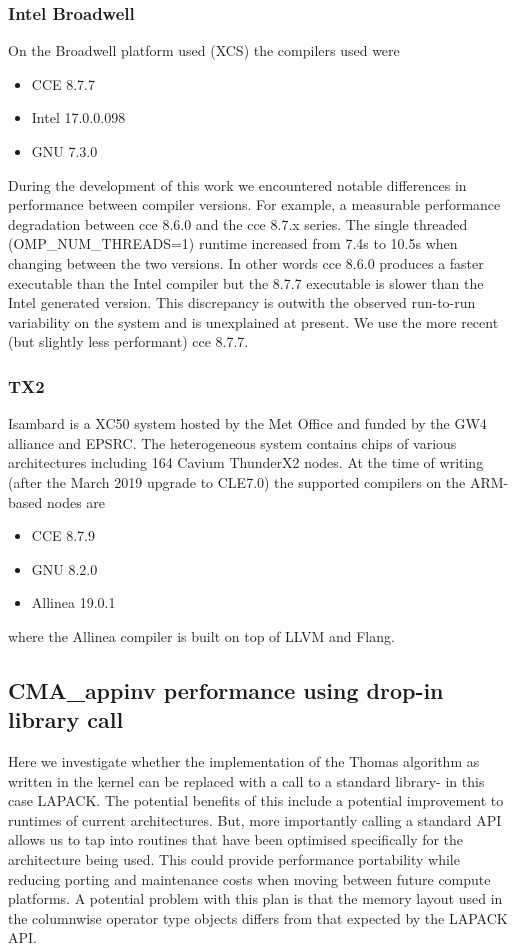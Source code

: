 \subsubsection{Intel Broadwell}
On the Broadwell platform used (XCS) the compilers used were
\begin{itemize}
\item CCE 8.7.7
\item Intel 17.0.0.098
\item GNU 7.3.0
\end{itemize}



During the development of this work we encountered notable differences in performance between compiler versions.
For example, a measurable performance degradation between cce 8.6.0 and the cce 8.7.x series.
The single threaded (OMP\_NUM\_THREADS=1) runtime increased from 7.4s to 10.5s when changing between the two versions.
In other words cce 8.6.0 produces a faster executable than the Intel compiler but the 8.7.7 executable is slower than the Intel generated version.
This discrepancy is outwith the observed run-to-run variability on the system and is unexplained at present.
We use the more recent (but slightly less performant) cce 8.7.7.

\subsubsection{TX2}
Isambard is a XC50 system hosted by the Met Office and funded by the GW4 alliance and EPSRC.
The heterogeneous system contains chips of various architectures including 164 Cavium ThunderX2 nodes.
At the time of writing (after the March 2019 upgrade to CLE7.0) the supported compilers on the ARM-based nodes are
\begin{itemize}
\item CCE 8.7.9
\item GNU 8.2.0
\item Allinea 19.0.1
\end{itemize}
where the Allinea compiler is built on top of LLVM and Flang.



\subsection{CMA\_appinv performance using drop-in library call}
Here we investigate whether the implementation of the Thomas algorithm as written in the kernel can be replaced with a call to a standard library- in this case LAPACK.
The potential benefits of this include a potential improvement to runtimes of current architectures.
But, more importantly calling a standard API allows us to tap into routines that have been optimised specifically for the architecture being used.
This could provide performance portability while reducing porting and maintenance costs when moving between future compute platforms.
A potential problem with this plan is that the memory layout used in the columnwise operator type objects differs from that expected by the LAPACK API.

